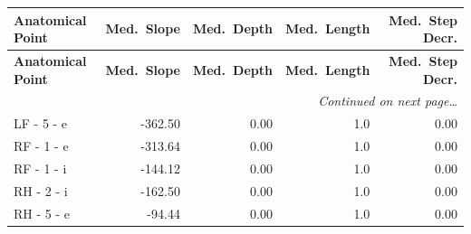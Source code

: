 \documentclass[a4paper,11pt]{article}
\begin{document}
\begin{small}
\begin{longtable}{p{4.5cm}rrrr}
\toprule
\textbf{Anatomical Point} &
\textbf{Med.\ Slope} &
\textbf{Med.\ Depth} &
\textbf{Med.\ Length} &
\textbf{Med.\ Step Decr.} \\
\midrule
\endfirsthead
\toprule
\textbf{Anatomical Point} &
\textbf{Med.\ Slope} &
\textbf{Med.\ Depth} &
\textbf{Med.\ Length} &
\textbf{Med.\ Step Decr.} \\
\midrule
\endhead
\midrule
\multicolumn{5}{r}{\small\emph{Continued on next page\ldots}} \\
\endfoot
\bottomrule
\endlastfoot
LF - 5 - e & -362.50 & 0.00 & 1.0 & 0.00 \\
RF - 1 - e & -313.64 & 0.00 & 1.0 & 0.00 \\
RF - 1 - i & -144.12 & 0.00 & 1.0 & 0.00 \\
RH - 2 - i & -162.50 & 0.00 & 1.0 & 0.00 \\
RH - 5 - e & -94.44 & 0.00 & 1.0 & 0.00 \\
\end{longtable}
\end{small}
\end{document}
